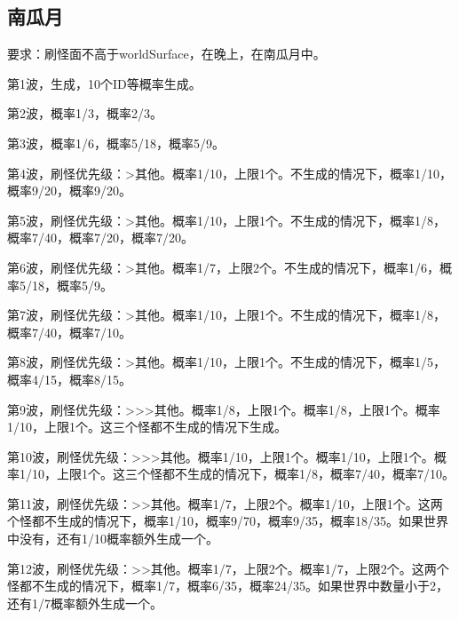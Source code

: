 \subsection{南瓜月}
要求：刷怪面不高于worldSurface，在晚上，在南瓜月中。

第1波，生成，10个ID等概率生成。

第2波，概率1/3，概率2/3。

第3波，概率1/6，概率5/18，概率5/9。

第4波，刷怪优先级：>其他。概率1/10，上限1个。不生成的情况下，概率1/10，概率9/20，概率9/20。

第5波，刷怪优先级：>其他。概率1/10，上限1个。不生成的情况下，概率1/8，概率7/40，概率7/20，概率7/20。

第6波，刷怪优先级：>其他。概率1/7，上限2个。不生成的情况下，概率1/6，概率5/18，概率5/9。

第7波，刷怪优先级：>其他。概率1/10，上限1个。不生成的情况下，概率1/8，概率7/40，概率7/10。

第8波，刷怪优先级：>其他。概率1/10，上限1个。不生成的情况下，概率1/5，概率4/15，概率8/15。

第9波，刷怪优先级：>>>其他。概率1/8，上限1个。概率1/8，上限1个。概率1/10，上限1个。这三个怪都不生成的情况下生成。

第10波，刷怪优先级：>>>其他。概率1/10，上限1个。概率1/10，上限1个。概率1/10，上限1个。这三个怪都不生成的情况下，概率1/8，概率7/40，概率7/10。

第11波，刷怪优先级：>>其他。概率1/7，上限2个。概率1/10，上限1个。这两个怪都不生成的情况下，概率1/10，概率9/70，概率9/35，概率18/35。如果世界中没有，还有1/10概率额外生成一个。

第12波，刷怪优先级：>>其他。概率1/7，上限2个。概率1/7，上限2个。这两个怪都不生成的情况下，概率1/7，概率6/35，概率24/35。如果世界中数量小于2，还有1/7概率额外生成一个。

